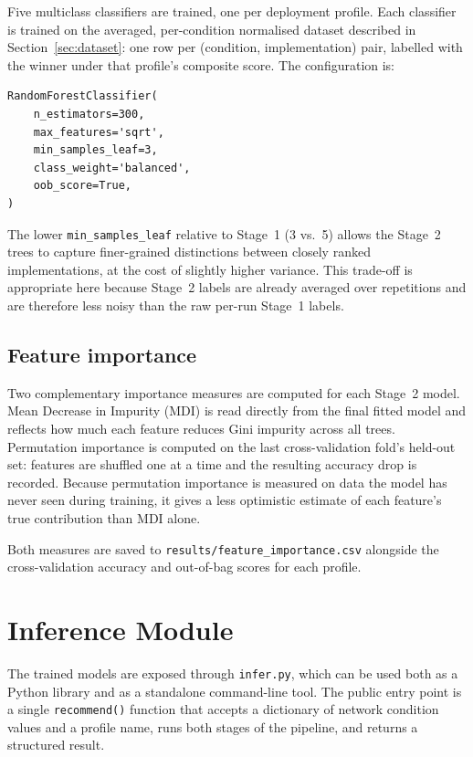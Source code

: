 Five multiclass classifiers are trained, one per deployment profile. Each
classifier is trained on the averaged, per-condition normalised dataset
described in Section~\ref{sec:dataset}: one row per (condition, implementation)
pair, labelled with the winner under that profile's composite score. The
configuration is:

\begin{verbatim}
RandomForestClassifier(
    n_estimators=300,
    max_features='sqrt',
    min_samples_leaf=3,
    class_weight='balanced',
    oob_score=True,
)
\end{verbatim}

The lower \texttt{min\_samples\_leaf} relative to Stage~1 (3 vs.\ 5) allows
the Stage~2 trees to capture finer-grained distinctions between closely ranked
implementations, at the cost of slightly higher variance. This trade-off is
appropriate here because Stage~2 labels are already averaged over repetitions
and are therefore less noisy than the raw per-run Stage~1 labels.

\subsection{Feature importance}
\label{subsec:feature-importance}

Two complementary importance measures are computed for each Stage~2 model.
Mean Decrease in Impurity (MDI) is read directly from the final fitted model
and reflects how much each feature reduces Gini impurity across all trees.
Permutation importance is computed on the last cross-validation fold's held-out
set: features are shuffled one at a time and the resulting accuracy drop is
recorded. Because permutation importance is measured on data the model has
never seen during training, it gives a less optimistic estimate of each
feature's true contribution than MDI alone.

Both measures are saved to \texttt{results/feature\_importance.csv} alongside
the cross-validation accuracy and out-of-bag scores for each profile.

\section{Inference Module}
\label{sec:inference}

The trained models are exposed through \texttt{infer.py}, which can be used
both as a Python library and as a standalone command-line tool. The public
entry point is a single \texttt{recommend()} function that accepts a
dictionary of network condition values and a profile name, runs both stages
of the pipeline, and returns a structured result.

